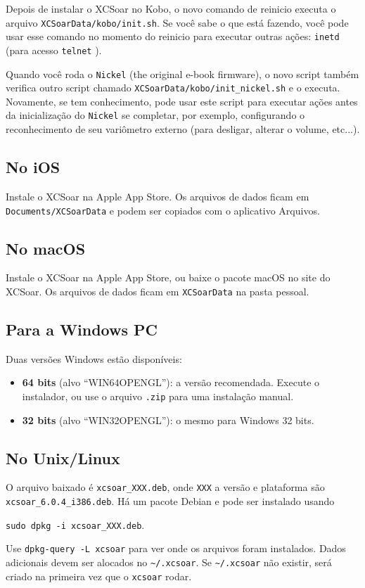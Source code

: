 Depois de instalar o XCSoar no Kobo, o novo comando de reinicio executa o arquivo \texttt{XCSoarData/kobo/init.sh}.  Se você sabe o que está fazendo, você pode usar esse comando no momento do reinicio para executar outras ações: \texttt{inetd} (para acesso \texttt{telnet}
).

Quando você roda o \texttt{Nickel} (the original e-book firmware), o novo script também verifica outro script chamado \texttt{XCSoarData/kobo/init\_nickel.sh} e o executa.  Novamente, se tem conhecimento, pode usar este script para executar ações antes da inicialização do \texttt{Nickel} se completar, por exemplo, configurando o reconhecimento de seu variômetro externo (para desligar, alterar o volume, etc...).

\subsection*{No iOS}

Instale o XCSoar na Apple App Store.  Os arquivos de dados ficam em
\texttt{Documents/XCSoarData} e podem ser copiados com o aplicativo Arquivos.

\subsection*{No macOS}

Instale o XCSoar na Apple App Store, ou baixe o pacote macOS no site do
XCSoar.  Os arquivos de dados ficam em \texttt{XCSoarData} na pasta pessoal.

\subsection*{Para a Windows PC}

Duas versões Windows estão disponíveis:
\begin{itemize}
\item \textbf{64 bits} (alvo ``WIN64OPENGL''): a versão recomendada.
  Execute o instalador, ou use o arquivo \verb|.zip| para uma instalação
  manual.
\item \textbf{32 bits} (alvo ``WIN32OPENGL''): o mesmo para Windows
  32 bits.
\end{itemize}

\subsection*{No Unix/Linux}

O arquivo baixado é \verb|xcsoar_XXX.deb|, onde \verb|XXX| a versão e plataforma são \verb|xcsoar_6.0.4_i386.deb|.
Há um pacote Debian e pode ser instalado usando
\begin{center}
\verb|sudo dpkg -i xcsoar_XXX.deb|.
\end{center}
Use \verb|dpkg-query -L xcsoar| para ver onde os arquivos foram instalados.  Dados adicionais devem ser alocados no \verb|~/.xcsoar|.
Se \verb|~/.xcsoar| não existir, será criado na primeira vez que o \verb|xcsoar| rodar.

